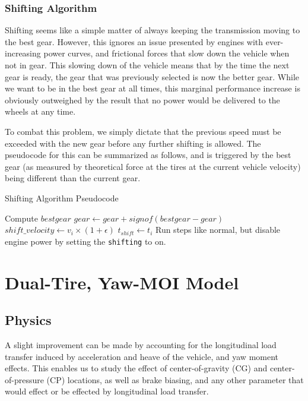 \documentclass{article}
\begin{document}
\subsubsection{Shifting Algorithm}

Shifting seems like a simple matter of always keeping the transmission moving to the best gear. However, this ignores an issue presented by engines with ever-increasing power curves, and frictional forces that slow down the vehicle when not in gear. This slowing down of the vehicle means that by the time the next gear is ready, the gear that was previously selected is now the better gear. While we want to be in the best gear at all times, this marginal performance increase is obviously outweighed by the result that no power would be delivered to the wheels at any time.

To combat this problem, we simply dictate that the previous speed must be exceeded with the new gear before any further shifting is allowed. The pseudocode for this can be summarized as follows, and is triggered by the best gear (as measured by theoretical force at the tires at the current vehicle velocity) being different than the current gear.

\begin{algorithm}[H]
\caption{Shifting Algorithm Pseudocode}
\begin{algorithmic}[1]
	\State Compute $bestgear$
	\State $gear \gets gear + signof(bestgear - gear)$
	\State $shift\_velocity \gets v_i \times (1 + \epsilon)$
	\State $t_{shift} \gets t_i$
	\State Run steps like normal, but disable engine power by setting the \texttt{shifting} to on.
	\EndWhile
	\EndIf
\end{algorithmic}
\end{algorithm}

\section{Dual-Tire, Yaw-MOI Model}

\subsection{Physics}

A slight improvement can be made by accounting for the longitudinal load transfer induced by acceleration and heave of the vehicle, and yaw moment effects. This enables us to study the effect of center-of-gravity (CG) and center-of-pressure (CP) locations, as well as brake biasing, and any other parameter that would effect or be effected by longitudinal load transfer.
\end{document}
